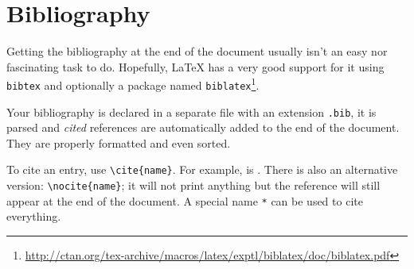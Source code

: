 \section{Bibliography}

Getting the bibliography at the end of the document usually isn't an easy nor
fascinating task to do.
Hopefully, \LaTeX{} has a very good support for it using \texttt{bibtex} and
optionally a package named
\texttt{biblatex}\footnote{\url{http://ctan.org/tex-archive/macros/latex/exptl/biblatex/doc/biblatex.pdf}}.

Your bibliography is declared in a separate file with an extension
\texttt{.bib}, it is parsed and \emph{cited} references are automatically added
to the end of the document.
They are properly formatted and even sorted.

To cite an entry, use \lstinline!\cite{name}!.
For example,  is
\cite{latex-comprehensive-symbol}.
There is also an alternative version: \lstinline!\nocite{name}!;
it will not print anything but the reference will still appear at the end of the
document.
A special name \texttt{*} can be used to cite everything.

